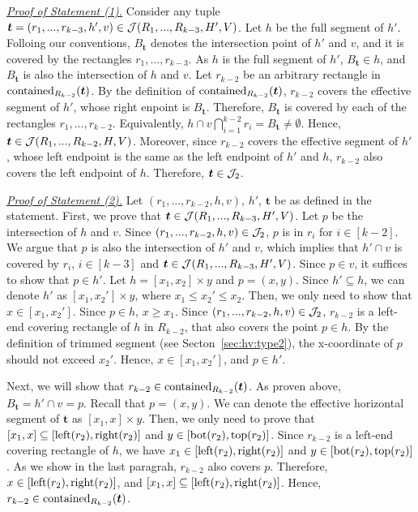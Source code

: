 \noindent \underline{\em Proof of Statement (1).} Consider any tuple $\textrm{\boldmath${t}$} = (r_1,...,r_{k-3}, h', v) \in \mathcal{J}(R_1,...,R_{k-3},H',V)$. Let $h$ be the full segment of $h'$. Folloing our conventions, $B_\bm{t}$ denotes the intersection point of $h'$ and $v$, and it is covered by the rectangles $r_1,...,r_{k-3}$. As $h$ is the full segment of $h'$, $B_\bm{t} \in h$, and $B_\bm{t}$ is also the intersection of $h$ and $v$. Let $r_{k-2}$ be an arbitrary rectangle in $\mathrm{contained}_{R_{k-2}}(\textrm{\boldmath${t}$})$. By the definition of $\mathrm{contained}_{R_{k-2}}(\textrm{\boldmath${t}$})$, $r_{k-2}$ covers the effective segment of $h'$, whose right enpoint is $B_{\bm{t}}$. Therefore, $B_{\bm{t}}$ is covered by each of the rectangles $r_1,...,r_{k-2}$. Equivalently, $h \cap v \bigcap_{i = 1}^{k-2} r_i = B_\bm{t} \neq \emptyset$. Hence,
$\textrm{\boldmath${t}$} \in \mathcal{J}(R_1,...,R_{k-2},H,V)$. Moreover, since $r_{k-2}$ covers the effective segment of $h'$, whose left endpoint is the same as the left endpoint of $h'$ and $h$, $r_{k-2}$ also covers the left endpoint of $h$. Therefore, $\textrm{\boldmath${t}$} \in \mathcal{J}_2$. 

\vgap 

\noindent \underline{\em Proof of Statement (2).} Let $(r_1,...,r_{k-2},h,v)$, $h'$, $\bm{t}$ be as defined in the statement. First, we prove that $\textrm{\boldmath${t}$}\in \mathcal{J}(R_1,...,R_{k-3}, H', V)$.
Let $p$ be the intersection of $h$ and $v$. Since $(r_1,...,r_{k-2},h,v)\in \mathcal{J}_2$, $p$ is in $r_i$ for $i \in [k-2]$.
We argue that $p$ is also the intersection of $h'$ and $v$, which implies that $h'\cap v$ is covered by $r_i$, $i \in [k-3]$ and $\textrm{\boldmath${t}$} \in \mathcal{J}(R_1,...,R_{k-3},H',V)$. Since $p \in v$, it suffices to show that $p \in h'$. Let $h = [x_1,x_2]\times y$ and $p = (x,y)$. Since $h' \subseteq h$, we can denote $h'$ as $[x_1, x_2'] \times y$, where $x_1 \le x_2' \le x_2$. Then, we only need to show that $x \in [x_1, x_2']$. Since $p \in h$, $x \ge x_1$. Since $(r_1,...,r_{k-2},h,v) \in \mathcal{J}_2$, $r_{k-2}$ is a left-end covering rectangle of $h$ in $R_{k-2}$, that also covers the point $p \in h$. By the definition of trimmed segment (see Secton~\ref{sec:hv:type2}), the x-coordinate of $p$ should not exceed $x_2'$. Hence, $x \in [x_1, x_2']$, and $p \in h'$.

\vgap 

Next, we will show that $r_{k-2}\in \mathrm{contained}_{R_{k-2}}(\textrm{\boldmath${t}$})$. As proven above, $B_\bm{t} = h'\cap v = p$. Recall that $p = (x,y)$. We can denote the effective horizontal segment of $\bm{t}$ as $[x_1, x] \times y$. Then, we only need to prove that $[x_1,x] \subseteq [\mathrm{left}(r_2), \mathrm{right}(r_2)]$ and $y \in [\mathrm{bot}(r_2), \mathrm{top}(r_2)]$. Since $r_{k-2}$ is a left-end covering rectangle of $h$, we have  $x_1 \in [\mathrm{left}(r_2), \mathrm{right}(r_2)]$ and $y \in [\mathrm{bot}(r_2), \mathrm{top}(r_2)]$. As we show in the last paragrah, $r_{k-2}$ also covers $p$. Therefore, $x \in [\mathrm{left}(r_2), \mathrm{right}(r_2)]$, and $[x_1,x] \subseteq [\mathrm{left}(r_2), \mathrm{right}(r_2)]$. Hence, $r_{k-2}\in \mathrm{contained}_{R_{k-2}}(\textrm{\boldmath${t}$})$.


